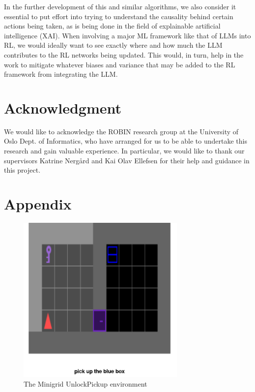\documentclass[conference]{IEEEtran}
\begin{document}
In the further development of this and similar algorithms, we also consider it essential to put effort into trying to understand the causality behind certain actions being taken, as is being done in the field of explainable artificial intelligence (XAI). When involving a major ML framework like that of LLMs into RL, we would ideally want to see exactly where and how much the LLM contributes to the RL networks being updated. This would, in turn, help in the work to mitigate whatever biases and variance that may be added to the RL framework from integrating the LLM.

\section*{Acknowledgment}

We would like to acknowledge the ROBIN research group at the University of Oslo Dept. of Informatics, who have arranged for us to be able to undertake this research and gain valuable experience. In particular, we would like to thank our supervisors Katrine Nergård and Kai Olav Ellefsen for their help and guidance in this project.





\section*{Appendix}

\begin{figure}[h]
\centerline{\includegraphics[width=3.25in]{figure/unlockpickupenv.png}}
\caption{The Minigrid UnlockPickup environment}
\label{unlockpickupenv}
\end{figure}
\end{document}
